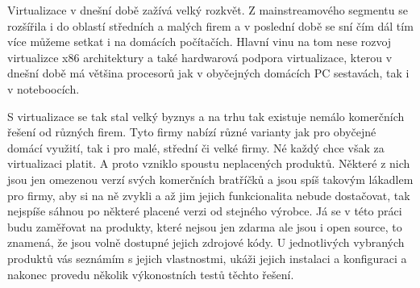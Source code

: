 Virtualizace v dnešní době zažívá velký rozkvět. Z mainstreamového segmentu se rozšířila i do oblastí středních a malých firem a v poslední době se sní čím dál tím více můžeme setkat i na domácích počítačích. Hlavní vinu na tom nese rozvoj virtualizce x86 architektury a také hardwarová podpora virtualizace, kterou v dnešní době má většina procesorů jak v obyčejných domácích PC sestavách, tak i v noteboocích.

S virtualizace se tak stal velký byznys a na trhu tak existuje nemálo komerčních řešení od různých firem. Tyto firmy nabízí různé varianty jak pro obyčejné domácí využití, tak i pro malé, střední či velké firmy. Né každý chce však za virtualizaci platit. A proto vzniklo spoustu neplacených produktů. Některé z nich jsou jen omezenou verzí svých komerčních bratříčků a jsou spíš takovým lákadlem pro firmy, aby si na ně zvykli a až jim jejich funkcionalita nebude dostačovat, tak nejspíše sáhnou po některé placené verzi od stejného výrobce. Já se v této práci budu zaměřovat na produkty, které nejsou jen zdarma ale jsou i open source, to znamená, že jsou volně dostupné jejich zdrojové kódy. U jednotlivých vybraných produktů vás seznámím s jejich vlastnostmi, ukáži jejich instalaci a konfiguraci a nakonec provedu několik výkonostních testů těchto řešení.

